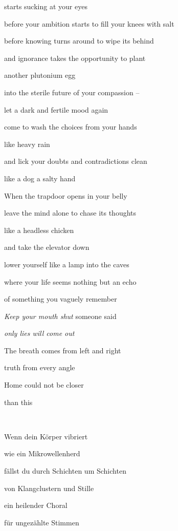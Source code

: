 \documentclass[a4paper]{article}
\begin{document}
starts sucking at your eyes

before your ambition starts to fill your knees with salt

before knowing turns around to wipe its behind

and ignorance takes the opportunity to plant 

another plutonium egg

into the sterile future of your compassion – 


\bigskip

let a dark and fertile mood again 

come to wash the choices from your hands

like heavy rain

and lick your doubts and contradictions clean

like a dog a salty hand


\bigskip

When the trapdoor opens in your belly

leave the mind alone to chase its thoughts

like a headless chicken

and take the elevator down

lower yourself like a lamp into the caves

where your life seems nothing but an echo

of something you vaguely remember


\bigskip

\textit{Keep your mouth shut }someone said 

{\itshape
only lies will come out}


\bigskip

The breath comes from left and right

truth from every angle

Home could not be closer 

than this


\bigskip


~

Wenn dein Körper vibriert

wie ein Mikrowellenherd

fällst du durch Schichten um Schichten

von Klangclustern und Stille

ein heilender Choral

für ungezählte Stimmen
\end{document}
